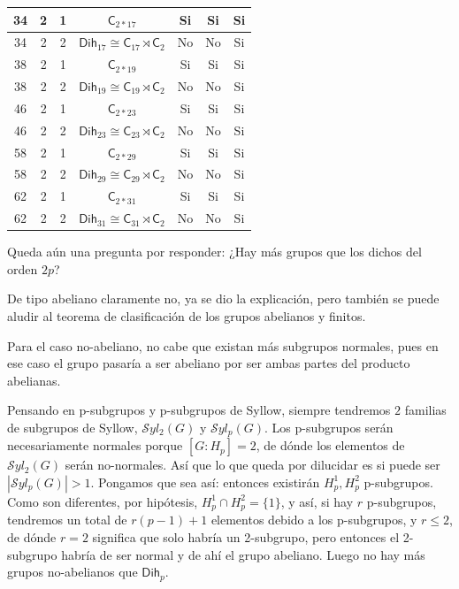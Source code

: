\documentclass[12pt,a4paper,fleqn,spanish,final,openright]{extbook}
\theoremstyle{definition}
\theoremstyle{remark}
\begin{document}
\begin{table}[h!]
\begin{center}
\begin{tabular}{c|c|c|c|c|c|c}
            \hline
            34 & 2 & 1 & ${\textsf{C}}_{2*17}$ & Si & Si & Si \\
            \hline
            34 & 2 & 2  & ${{\textsf{Dih}}_{17}}  \cong  {{\textsf{C}}_{17}}\rtimes{{{\textsf{C}}_{2}}}$ & No & No & Si \\
            \hline
            38 & 2 & 1 & ${\textsf{C}}_{2*19}$ & Si & Si & Si \\
            \hline
            38 & 2 & 2  & ${{\textsf{Dih}}_{19}}  \cong  {{\textsf{C}}_{19}}\rtimes{{{\textsf{C}}_{2}}}$ & No & No & Si \\
            \hline
            46 & 2 & 1 & ${\textsf{C}}_{2*23}$ & Si & Si & Si \\
            \hline
            46 & 2 & 2  & ${{\textsf{Dih}}_{23}}  \cong  {{\textsf{C}}_{23}}\rtimes{{{\textsf{C}}_{2}}}$ & No & No & Si \\
            \hline
            58 & 2 & 1 & ${\textsf{C}}_{2*29}$ & Si & Si & Si \\
            \hline
            58 & 2 & 2  & ${{\textsf{Dih}}_{29}}  \cong  {{\textsf{C}}_{29}}\rtimes{{{\textsf{C}}_{2}}}$ & No & No & Si \\
            \hline
            62 & 2 & 1 & ${\textsf{C}}_{2*31}$ & Si & Si & Si \\
            \hline
            62 & 2 & 2  & ${{\textsf{Dih}}_{31}}  \cong  {{\textsf{C}}_{31}}\rtimes{{{\textsf{C}}_{2}}}$ & No & No & Si \\
            \hline
        \end{tabular}
    \end{center}
\end{table}








    Queda aún una pregunta por responder: ¿Hay más grupos que los dichos del orden $2p$?
    
    De tipo abeliano claramente no, ya se dio la explicación, pero también se puede aludir al teorema de clasificación de los grupos abelianos y finitos.
    
    Para el caso no-abeliano, no cabe que existan más subgrupos normales, pues en ese caso el grupo pasaría a ser abeliano por ser ambas partes del producto abelianas. 
    
    Pensando en p-subgrupos y p-subgrupos de Syllow, siempre tendremos $2$ familias de subgrupos de Syllow, $\mathcal{S}yl_2 (G)$ y $\mathcal{S}yl_p (G)$. Los p-subgrupos serán necesariamente normales porque $[G:H_p]=2$, de dónde los elementos de $\mathcal{S}yl_2 (G)$ serán no-normales. Así que lo que queda por dilucidar es si puede ser $\left|\mathcal{S}yl_{p}(G)\right|>1$. Pongamos que sea así: entonces existirán $H_p^1,H_p^2$ p-subgrupos. Como son diferentes, por hipótesis, $H_p^1 \cap H_p^2 = \{1\}$, y así, si hay $r$ p-subgrupos, tendremos un total de $r(p-1)+1$ elementos debido a los p-subgrupos, y $r\le 2$, de dónde $r=2$ significa que solo habría un 2-subgrupo, pero entonces el 2-subgrupo habría de ser normal y de ahí el grupo abeliano. Luego no hay más grupos no-abelianos que ${\mathsf{Dih}}_{p}$.
    
\end{document}
